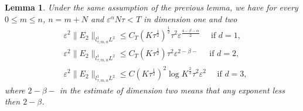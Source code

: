 \documentclass[10pt,a4paper]{article}
\newtheorem{lemma}[theorem]{Lemma}
\begin{document}
  \begin{lemma}\label{lemE2} %
    Under the same assumption of the previous lemma, we have  for every \(0 \leq
    m \leq n \), \(n = m+N\) and \(\varepsilon^\alpha N\tau < T\) in dimension one
    and two
    \begin{align}
      &\label{E2d1} \varepsilon^2 \| E_2 \|_{l^1_{\tau,m,n}L^2} \leq C_T
      (K\tau^\frac12)^\frac12 \tau^2 \varepsilon^{\frac{4-\beta-\alpha}2} 
      \quad \text{ if } d=1,\\
      &\label{E2d2} \varepsilon^2 \| E_2 \|_{l^1_{\tau,m,n}L^2} \leq C_T 
      (K\tau^\frac12) \tau^2 \varepsilon^{2-\beta-}
      \quad \text{ if } d=2,\\
      &\label{E2d3} \varepsilon^2 \| E_2 \|_{l^1_{\tau,m,n}L^2} \leq C 
      (K\tau^\frac12)^2 \log{K}^\frac23 \tau^2 \varepsilon^2
      \quad \text{ if } d=3,
    \end{align}
    where \(2-\beta-\) in the estimate of dimension two means that any exponent
    less then \(2-\beta\).
  \end{lemma}
\end{document}
